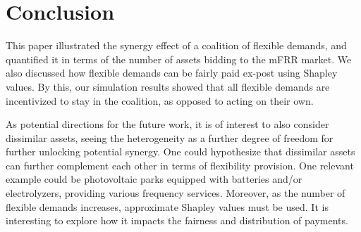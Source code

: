 \documentclass[conference]{IEEEtran}
\begin{document}
\section{Conclusion}
\label{chapter4}

This paper illustrated the synergy effect of a coalition of flexible demands, and quantified it in terms of the number of assets bidding to the mFRR market. We also discussed how flexible demands can be fairly paid ex-post using Shapley values. By this, our simulation results showed that all flexible demands are incentivized to stay in the coalition, as opposed to acting on their own. %

As potential directions for the future work, it is of interest to also consider dissimilar assets, seeing the heterogeneity as a further degree of freedom for further unlocking potential synergy. One could hypothesize that dissimilar assets can further complement each other in terms of flexibility provision. One relevant example could be photovoltaic parks equipped with batteries and/or electrolyzers, providing various frequency services. Moreover, as the number of flexible demands increases, approximate Shapley values must be used. It is interesting to explore how it impacts the fairness and distribution of payments.


% 



\vfill
\end{document}
